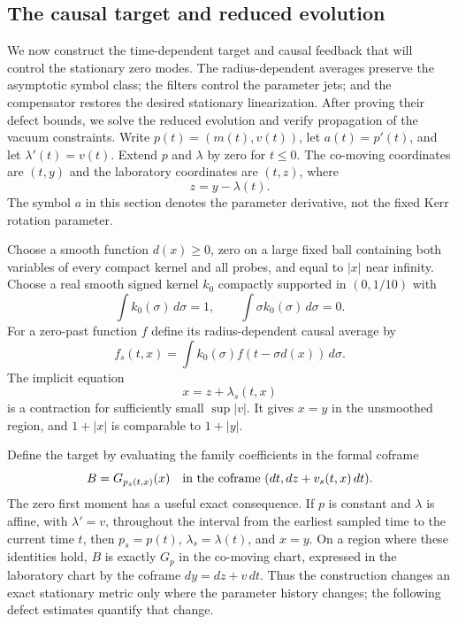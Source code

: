 \subsection{The causal target and reduced evolution}\label{st:reduction}

We now construct the time-dependent target and causal feedback that
will control the stationary zero modes. The radius-dependent averages
preserve the asymptotic symbol class; the filters control the parameter
jets; and the compensator restores the desired stationary linearization.
After proving their defect bounds, we solve the reduced evolution and
verify propagation of the vacuum constraints. Write $p(t)=(m(t),v(t))$,
let $a(t)=p'(t)$, and let $\lambda'(t)=v(t)$.
Extend $p$ and $\lambda$ by zero for $t\leq0$.
The co-moving coordinates are $(t,y)$ and the laboratory
coordinates are $(t,z)$, where
\[
 z=y-\lambda(t).
\]
The symbol $a$ in this section denotes the parameter derivative,
not the fixed Kerr rotation parameter.

Choose a smooth function $d(x)\geq0$, zero on a large fixed
ball containing both variables of every compact kernel and all
probes, and equal to $|x|$ near infinity.  Choose a real smooth
signed kernel $k_0$ compactly supported in $(0,1/10)$ with
\[
 \int k_0(\sigma)\,d\sigma=1,\qquad
 \int \sigma k_0(\sigma)\,d\sigma=0.
\]
For a zero-past function $f$ define its radius-dependent causal
average by
\begin{equation}\label{st:averaging}
 f_s(t,x)=\int k_0(\sigma)f(t-\sigma d(x))\,d\sigma .
\end{equation}
The implicit equation
\begin{equation}\label{st:implicit-position}
 x=z+\lambda_s(t,x)
\end{equation}
is a contraction for sufficiently small $\sup|v|$.
It gives $x=y$ in the unsmoothed region, and $1+|x|$ is
comparable to $1+|y|$.

Define the target by evaluating the family coefficients in the
formal coframe
\begin{equation}\label{st:causal-target}
 B=G_{p_s(t,x)}(x)
       \quad\hbox{in the coframe }(dt,dz+v_s(t,x)\,dt).
\end{equation}
The zero first moment has a useful exact consequence.  If $p$ is
constant and $\lambda$ is affine, with $\lambda'=v$, throughout the
interval from the earliest sampled time to the current time $t$, then
$p_s=p(t)$, $\lambda_s=\lambda(t)$, and
$x=y$.  On a region where these identities hold, $B$ is exactly $G_p$
in the co-moving chart, expressed in the laboratory chart by the
coframe $dy=dz+v\,dt$.  Thus the construction changes an exact
stationary metric only where the parameter history changes; the
following defect estimates quantify that change.

